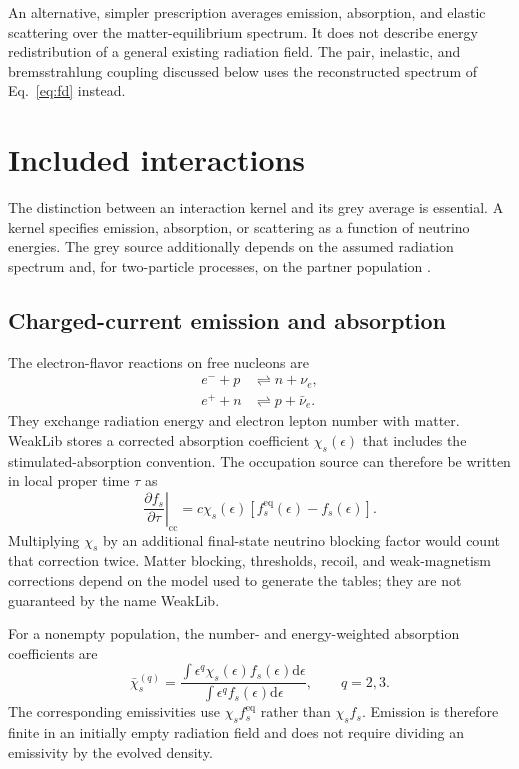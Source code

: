 \documentclass[aps,prd,reprint,nofootinbib,notitlepage]{revtex4-2}
\newcommand{\nue}{\nu_e}
\newcommand{\anue}{\bar{\nu}_e}
\newcommand{\dd}{\mathrm{d}}
\newcommand{\eq}{\mathrm{eq}}
\begin{document}
An alternative, simpler prescription averages emission, absorption, and
elastic scattering over the matter-equilibrium spectrum. It does not
describe energy redistribution of a general existing radiation field.
The pair, inelastic, and bremsstrahlung coupling discussed below uses the
reconstructed spectrum of Eq.~\eqref{eq:fd} instead.

\section{Included interactions}

The distinction between an interaction kernel and its grey average is
essential. A kernel specifies emission, absorption, or scattering as a
function of neutrino energies. The grey source additionally depends on
the assumed radiation spectrum and, for two-particle processes, on the
partner population \cite{Bruenn1985,Burrows2006,Chiesa2025}.

\subsection{Charged-current emission and absorption}

The electron-flavor reactions on free nucleons are
\begin{align}
 e^-+p&\rightleftharpoons n+\nue,\\
 e^++n&\rightleftharpoons p+\anue.
\end{align}
They exchange radiation energy and electron lepton number with matter.
WeakLib stores a corrected absorption coefficient $\chi_s(\epsilon)$
that includes the stimulated-absorption convention. The occupation source
can therefore be written in local proper time $\tau$ as
\begin{equation}
 \left.\frac{\partial f_s}{\partial\tau}\right|_{\mathrm{cc}}
   =c\chi_s(\epsilon)
       [f_s^{\eq}(\epsilon)-f_s(\epsilon)].
 \label{eq:cc_source}
\end{equation}
Multiplying $\chi_s$ by an additional final-state neutrino blocking factor
would count that correction twice. Matter blocking, thresholds, recoil,
and weak-magnetism corrections depend on the model used to generate the
tables; they are not guaranteed by the name WeakLib.

For a nonempty population, the number- and energy-weighted absorption
coefficients are
\begin{equation}
 \bar\chi_s^{(q)}=
 \frac{\int\epsilon^q\chi_s(\epsilon)f_s(\epsilon)\dd\epsilon}
      {\int\epsilon^q f_s(\epsilon)\dd\epsilon},\qquad q=2,3.
\end{equation}
The corresponding emissivities use $\chi_s f_s^{\eq}$ rather than
$\chi_s f_s$. Emission is therefore finite in an initially empty radiation
field and does not require dividing an emissivity by the evolved density.
\end{document}
